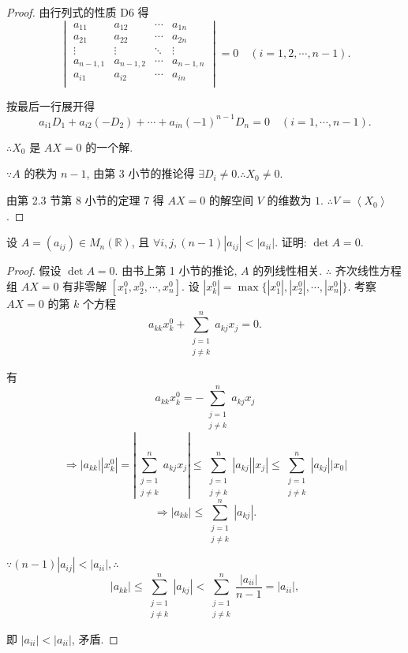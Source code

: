 \documentclass{ctexart}
\begin{document}
\begin{proof}
    由行列式的性质 D6 得
    \[\begin{vmatrix}
        a_{11} & a_{12} & \cdots & a_{1n} \\
        a_{21} & a_{22} & \cdots & a_{2n} \\
        \vdots & \vdots & \ddots & \vdots \\
        a_{n-1,1} & a_{n-1,2} & \cdots & a_{n-1,n} \\
        a_{i1} & a_{i2} & \cdots & a_{in} \\
    \end{vmatrix}=0\quad(i=1,2,\cdots,n-1).\]

    按最后一行展开得
    \[a_{i1}D_1+a_{i2}(-D_2)+\cdots+a_{in}(-1)^{n-1}D_n=0\quad(i=1,\cdots,n-1).\]

    $\therefore X_0$ 是 $AX=0$ 的一个解.

    $\because A$ 的秩为 $n-1$, 由第 3 小节的推论得 $\exists D_i\neq0.\therefore X_0\neq0$.

    由第 2.3 节第 8 小节的定理 7 得 $AX=0$ 的解空间 $V$ 的维数为 $1$. $\therefore V=\left<X_0\right>$.
\end{proof}
\begin{exercise}%
    设 $A=(a_{ij})\in M_n(\mathbb{R})$, 且 $\forall i,j,(n-1)|a_{ij}|<|a_{ii}|$. 证明: $\det A=0$.
\end{exercise}
\begin{proof}
    假设 $\det A=0$. 由书上第 1 小节的推论, $A$ 的列线性相关. $\therefore$ 齐次线性方程组 $AX=0$ 有非零解 $[x^0_1,x^0_2,\cdots,x^0_n]$. 设 $|x^0_k|=\max\{|x^0_1|,|x^0_2|,\cdots,|x^0_n|\}$. 考察 $AX=0$ 的第 $k$ 个方程
    \[a_{kk}x^0_k+\sum_{\substack{j=1\\j\neq k}}^na_{kj}x_j=0.\]

    有
    \[a_{kk}x^0_k=-\sum_{\substack{j=1\\j\neq k}}^na_{kj}x_j\]
    \[\Rightarrow|a_{kk}||x^0_k|=\left|\sum_{\substack{j=1\\j\neq k}}^na_{kj}x_j\right|\leq\sum_{\substack{j=1\\j\neq k}}^n|a_{kj}||x_j|\leq\sum_{\substack{j=1\\j\neq k}}^n|a_{kj}||x_0|\]
    \[\Rightarrow|a_{kk}|\leq\sum_{\substack{j=1\\j\neq k}}^n|a_{kj}|.\]

    $\because(n-1)|a_{ij}|<|a_{ii}|,\therefore$
    \[|a_{kk}|\leq\sum_{\substack{j=1\\j\neq k}}^n|a_{kj}|<\sum_{\substack{j=1\\j\neq k}}^n\dfrac{|a_{ii}|}{n-1}=|a_{ii}|,\]

    即 $|a_{ii}|<|a_{ii}|$, 矛盾.
\end{proof}
\end{document}
